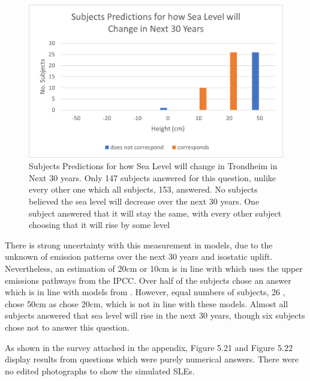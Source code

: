 \begin{figure}[H]
    \centering
    \includegraphics{fig_results/slr-future.png}
    \caption{Subjects Predictions for how Sea Level will change in Trondheim in Next 30 years. Only 147 subjects answered for this question, unlike every other one which all subjects, 153, answered. No subjects believed the sea level will decrease over the next 30 years. One subject answered that it will stay the same, with every other subject choosing that it will rise by some level }
    \label{fig:my_label}
\end{figure}

There is strong uncertainty with this measurement in models, due to the unknown of emission patterns over the next 30 years and isostatic uplift. Nevertheless, an estimation of 20cm or 10cm is in line with \cite{kartverket_se_2021} which uses the upper emissions pathways from the IPCC. Over half of the subjects chose an answer which is in line with models from \cite{kartverket_se_2021}. However, equal numbers of subjects, 26 , chose 50cm as chose 20cm,  which is not in line with these models. Almost all subjects answered that sea level will rise in the next 30 years, though six subjects chose not to answer this question.  

As shown in the survey attached in the appendix, Figure 5.21 and Figure 5.22 display results from questions which were purely numerical answers. There were no edited photographs to show the simulated SLEs.
\paragraph{}


